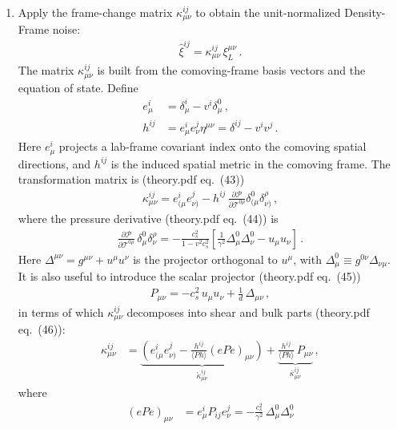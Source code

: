 \documentclass[12pt,aps,preprint,nofootinbib,noshowkeys,noshowpacs,longbibliography,superscriptaddress,tightenlines]{revtex4-2}
\begin{document}
\begin{enumerate}
\item Apply the frame-change matrix $\kappa_{\mu\nu}^{ij}$ to obtain the
unit-normalized Density-Frame noise:
\begin{align}
   \hat\xi^{ij}  = \kappa_{\mu\nu}^{ij}\, \xi^{\mu\nu}_{L}\,.
\end{align}
The matrix $\kappa^{ij}_{\mu\nu}$ is built from the comoving-frame
basis vectors and the equation of state.  Define
\begin{align}
  e^i_\mu &= \delta^i_\mu - v^i \delta^0_\mu \,, \label{eq:e_def}\\
  h^{ij}  &= e^i_\mu e^j_\nu \eta^{\mu\nu} = \delta^{ij} - v^i v^j \,. \label{eq:h_def}
\end{align}
Here $e^i_\mu$ projects a lab-frame covariant index onto the comoving spatial
directions, and $h^{ij}$ is the induced spatial metric in the comoving frame.
The transformation matrix is (theory.pdf eq.\ (43))
\begin{align}
  \kappa^{ij}_{\mu\nu}
  = e^i_{(\mu} e^j_{\nu)}
    - h^{ij}\,\frac{\partial\mathcal{P}}{\partial\mathcal{T}^{0\rho}}
      \delta^0_{(\mu}\delta^\rho_{\nu)} \,, \label{eq:kappa_def}
\end{align}
where the pressure derivative (theory.pdf eq.\ (44)) is
\begin{align}
  \frac{\partial\mathcal{P}}{\partial\mathcal{T}^{0\rho}}\,
  \delta^0_\mu\delta^\rho_\nu
  = -\frac{c_s^2}{1 - v^2 c_s^2}
    \left[\frac{1}{\gamma^2}\Delta^0_\mu\Delta^0_\nu - u_\mu u_\nu\right] \,.
    \label{eq:dPdT}
\end{align}
Here $\Delta^{\mu\nu} = g^{\mu\nu} + u^\mu u^\nu$ is the projector orthogonal to
$u^\mu$, with $\Delta^0_\mu \equiv g^{0\nu}\Delta_{\nu\mu}$.
It is also useful to introduce the scalar projector (theory.pdf eq.\ (45))
\begin{align}
  P_{\mu\nu} = -c_s^2\,u_\mu u_\nu + \frac{1}{d}\,\Delta_{\mu\nu} \,,
  \label{eq:Pmunu}
\end{align}
in terms of which $\kappa^{ij}_{\mu\nu}$ decomposes into shear and bulk parts
(theory.pdf eq.\ (46)):
\begin{align}
  \kappa^{ij}_{\mu\nu}
  &= \underbrace{\left(e^i_{(\mu}e^j_{\nu)}
      - \frac{h^{ij}}{\langle Ph\rangle}(ePe)_{\mu\nu}\right)}_{\mathring\kappa^{ij}_{\mu\nu}}
    + \underbrace{\frac{h^{ij}}{\langle Ph\rangle}\,P_{\mu\nu}}_{\bar\kappa^{ij}_{\mu\nu}} \,,
\end{align}
where
\begin{align}
  (ePe)_{\mu\nu} &= e^i_\mu P_{ij} e^j_\nu
    = -\frac{c_s^2}{\gamma^2}\,\Delta^0_\mu\Delta^0_\nu

\end{align}
\end{enumerate}
\end{document}
